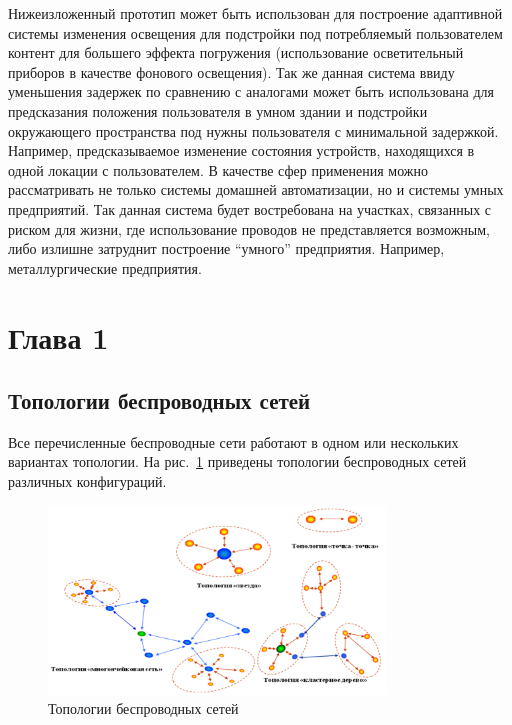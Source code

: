 \documentclass[a4paper,12pt]{article}
\begin{document}
Нижеизложенный прототип может быть использован для построение адаптивной системы изменения освещения для подстройки под потребляемый пользователем контент для большего эффекта погружения (использование осветительный приборов в качестве фонового освещения). Так же данная система ввиду уменьшения задержек по сравнению с аналогами может быть использована для предсказания положения пользователя в умном здании и подстройки окружающего пространства под нужны пользователя с минимальной задержкой. Например, предсказываемое изменение состояния устройств, находящихся в одной локации с пользователем.
В качестве сфер применения можно рассматривать не только системы домашней автоматизации, но и системы умных предприятий. Так данная система будет востребована на участках, связанных с риском для жизни, где использование проводов не представляется возможным, либо излишне затруднит построение “умного” предприятия. Например, металлургические предприятия.

\newpage

\section{Глава 1}

\subsection{Топологии беспроводных сетей}
Все перечисленные беспроводные сети работают в одном или нескольких вариантах
топологии. На рис.~\ref{fig:topologies} приведены топологии беспроводных сетей различных конфигураций.

\begin{figure}[h]
    \centering
    \includegraphics[width=0.8\textwidth]{images/Fig06.png}
    \caption{Топологии беспроводных сетей \cite{wirelessNetProtocols} }
    \label{fig:topologies}
\end{figure}
\end{document}
